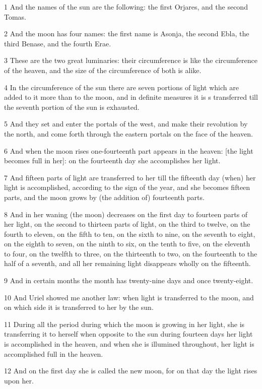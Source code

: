 \par 1 And the names of the sun are the following: the first Orjares, and the second Tomas.
\par 2 And the moon has four names: the first name is Asonja, the second Ebla, the third Benase, and the fourth Erae.
\par 3 These are the two great luminaries: their circumference is like the circumference of the heaven, and the size of the circumference of both is alike.
\par 4 In the circumference of the sun there are seven portions of light which are added to it more than to the moon, and in definite measures it is s transferred till the seventh portion of the sun is exhausted.
\par 5  And they set and enter the portals of the west, and make their revolution by the north, and come forth through the eastern portals on the face of the heaven.
\par 6 And when the moon rises one-fourteenth part appears in the heaven: [the light becomes full in her]: on the fourteenth day she accomplishes her light.
\par 7 And fifteen parts of light are transferred to her till the fifteenth day (when) her light is accomplished, according to the sign of the year, and she becomes fifteen parts, and the moon grows by (the addition of) fourteenth parts.
\par 8 And in her waning (the moon) decreases on the first day to fourteen parts of her light, on the second to thirteen parts of light, on the third to twelve, on the fourth to eleven, on the fifth to ten, on the sixth to nine, on the seventh to eight, on the eighth to seven, on the ninth to six, on the tenth to five, on the eleventh to four, on the twelfth to three, on the thirteenth to two, on the fourteenth to the half of a seventh, and all her remaining light disappears wholly on the fifteenth.
\par 9 And in certain months the month has twenty-nine days and once twenty-eight.
\par 10 And Uriel showed me another law: when light is transferred to the moon, and on which side it is transferred to her by the sun.
\par 11 During all the period during which the moon is growing in her light, she is transferring it to herself when opposite to the sun during fourteen days her light is accomplished in the heaven, and when she is illumined throughout, her light is accomplished full in the heaven.
\par 12 And on the first day she is called the new moon, for on that day the light rises upon her.
